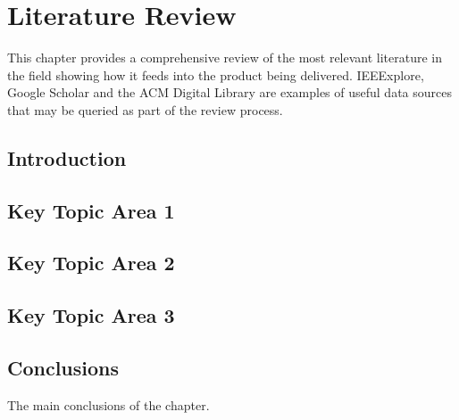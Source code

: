 \chapter{Literature Review}\label{ch:litReview}

This chapter provides a comprehensive review of the most relevant literature in the field showing how it feeds into the product being delivered. IEEExplore, Google Scholar and the ACM Digital Library are examples of useful data sources that may be queried as part of the review process. 

\section{Introduction}


\section{Key Topic Area 1}


\section{Key Topic Area 2}


\section{Key Topic Area 3}


\section{Conclusions}

The main conclusions of the chapter.


